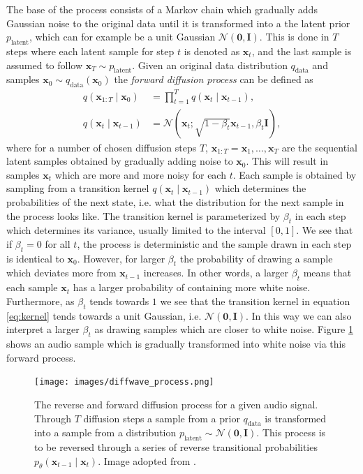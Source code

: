 \documentclass{report}
\begin{document}
The base of the process consists of a Markov chain which gradually adds Gaussian noise to the original data until it is transformed into a the latent prior $p_{\text{latent}}$, which can for example be a unit Gaussian $\mathcal{N}(\bm{0}, \bm{I})$. This is done in $T$ steps where each latent sample for step $t$ is denoted as $\bm{x}_t$, and the last sample is assumed to follow $\bm{x}_T \sim p_{\text{latent}}$. Given an original data distribution $q_{\text{data}}$ and samples $\bm{x}_0 \sim q_{\text{data}}(\bm{x}_0)$ the \textit{forward diffusion process} can be defined as
\begin{align}
    q(\bm{x}_{1:T} \mid \bm{x}_0) &= \prod_{t=1}^T q(\bm{x}_t \mid \bm{x}_{t-1}), \\
    q(\bm{x}_t \mid \bm{x}_{t-1}) &= \mathcal{N}(\bm{x}_t ; \sqrt{1-\beta_t} \bm{x}_{t-1}, \beta_t \textbf{I}), \label{eq:kernel}
\end{align}
where for a number of chosen diffusion steps $T$, $\bm{x}_{1:T} = \bm{x}_1, \dots, \bm{x}_T$ are the sequential latent samples obtained by gradually adding noise to $\bm{x}_0$. This will result in samples $\bm{x}_t$ which are more and more noisy for each $t$. Each sample is obtained by sampling from a transition kernel $q(\bm{x}_t \mid \bm{x}_{t-1})$ which determines the probabilities of the next state, i.e. what the distribution for the next sample in the process looks like. The transition kernel is parameterized by $\beta_t$ in each step which determines its variance, usually limited to the interval $[0, 1]$. We see that if $\beta_t = 0$ for all $t$, the process is deterministic and the sample drawn in each step is identical to $\bm{x}_0$. However, for larger $\beta_t$ the probability of drawing a sample which deviates more from $\bm{x}_{t-1}$ increases. In other words, a larger $\beta_t$ means that each sample $\bm{x}_t$ has a larger probability of containing more white noise. Furthermore, as $\beta_t$ tends towards $1$ we see that the transition kernel in equation \ref{eq:kernel} tends towards a unit Gaussian, i.e. $\mathcal{N}(\bm{0}, \bm{I})$. In this way we can also interpret a larger $\beta_t$ as drawing samples which are closer to white noise. Figure \ref{fig:diffwave1} shows an audio sample which is gradually transformed into white noise via this forward process.
\begin{figure}[H]
    \centering
    \texttt{[image: images/diffwave\_process.png]}
    \caption{\onehalfspacing The reverse and forward diffusion process for a given audio signal. Through $T$ diffusion steps a sample from a prior $q_{\text{data}}$ is transformed into a sample from a distribution $p_{\text{latent}} \sim \mathcal{N}(\bm{0}, \bm{I})$. This process is to be reversed through a series of reverse transitional probabilities $p_{\theta}(\bm{x}_{t-1} \mid \bm{x}_{t})$. Image adopted from \cite{kong2020diffwave}.}
    \label{fig:diffwave1}
\end{figure}
\end{document}
